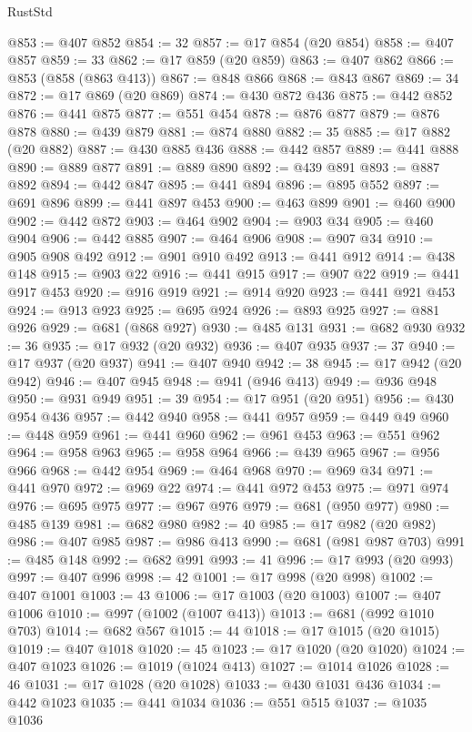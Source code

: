 \begin{lexlean}{RustStd}
\begin{coremodule}
@853 := @407 @852
@854 := 32
@857 := @17 @854 (@20 @854)
@858 := @407 @857
@859 := 33
@862 := @17 @859 (@20 @859)
@863 := @407 @862
@866 := @853 (@858 (@863 @413))
@867 := @848 @866
@868 := @843 @867
@869 := 34
@872 := @17 @869 (@20 @869)
@874 := @430 @872 @436
@875 := @442 @852
@876 := @441 @875
@877 := @551 @454
@878 := @876 @877
@879 := @876 @878
@880 := @439 @879
@881 := @874 @880
@882 := 35
@885 := @17 @882 (@20 @882)
@887 := @430 @885 @436
@888 := @442 @857
@889 := @441 @888
@890 := @889 @877
@891 := @889 @890
@892 := @439 @891
@893 := @887 @892
@894 := @442 @847
@895 := @441 @894
@896 := @895 @552
@897 := @691 @896
@899 := @441 @897 @453
@900 := @463 @899
@901 := @460 @900
@902 := @442 @872
@903 := @464 @902
@904 := @903 @34
@905 := @460 @904
@906 := @442 @885
@907 := @464 @906
@908 := @907 @34
@910 := @905 @908 @492
@912 := @901 @910 @492
@913 := @441 @912
@914 := @438 @148
@915 := @903 @22
@916 := @441 @915
@917 := @907 @22
@919 := @441 @917 @453
@920 := @916 @919
@921 := @914 @920
@923 := @441 @921 @453
@924 := @913 @923
@925 := @695 @924
@926 := @893 @925
@927 := @881 @926
@929 := @681 (@868 @927)
@930 := @485 @131
@931 := @682 @930
@932 := 36
@935 := @17 @932 (@20 @932)
@936 := @407 @935
@937 := 37
@940 := @17 @937 (@20 @937)
@941 := @407 @940
@942 := 38
@945 := @17 @942 (@20 @942)
@946 := @407 @945
@948 := @941 (@946 @413)
@949 := @936 @948
@950 := @931 @949
@951 := 39
@954 := @17 @951 (@20 @951)
@956 := @430 @954 @436
@957 := @442 @940
@958 := @441 @957
@959 := @449 @49
@960 := @448 @959
@961 := @441 @960
@962 := @961 @453
@963 := @551 @962
@964 := @958 @963
@965 := @958 @964
@966 := @439 @965
@967 := @956 @966
@968 := @442 @954
@969 := @464 @968
@970 := @969 @34
@971 := @441 @970
@972 := @969 @22
@974 := @441 @972 @453
@975 := @971 @974
@976 := @695 @975
@977 := @967 @976
@979 := @681 (@950 @977)
@980 := @485 @139
@981 := @682 @980
@982 := 40
@985 := @17 @982 (@20 @982)
@986 := @407 @985
@987 := @986 @413
@990 := @681 (@981 @987 @703)
@991 := @485 @148
@992 := @682 @991
@993 := 41
@996 := @17 @993 (@20 @993)
@997 := @407 @996
@998 := 42
@1001 := @17 @998 (@20 @998)
@1002 := @407 @1001
@1003 := 43
@1006 := @17 @1003 (@20 @1003)
@1007 := @407 @1006
@1010 := @997 (@1002 (@1007 @413))
@1013 := @681 (@992 @1010 @703)
@1014 := @682 @567
@1015 := 44
@1018 := @17 @1015 (@20 @1015)
@1019 := @407 @1018
@1020 := 45
@1023 := @17 @1020 (@20 @1020)
@1024 := @407 @1023
@1026 := @1019 (@1024 @413)
@1027 := @1014 @1026
@1028 := 46
@1031 := @17 @1028 (@20 @1028)
@1033 := @430 @1031 @436
@1034 := @442 @1023
@1035 := @441 @1034
@1036 := @551 @515
@1037 := @1035 @1036

\end{coremodule}
\end{lexlean}
